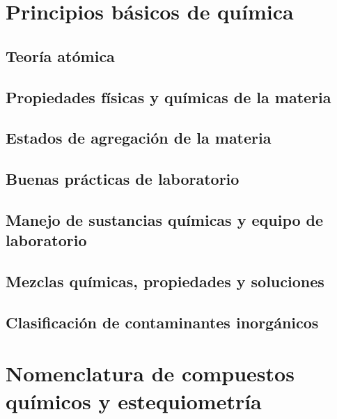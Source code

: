 \documentclass{../summarie}
\begin{document}
\frontmatter

    \Portada
    \tableofcontents
    \listoffigures
    \listoftables

\mainmatter

    \onehalfspacing
    \bibliographyunit[\chapter]


\part{Principios básicos de química}

    \chapter{Teoría atómica}     
    \chapter{Propiedades físicas y químicas de la materia} 
    \chapter{Estados de agregación de la materia} 
    \chapter{Buenas prácticas de laboratorio} 
    \chapter{Manejo de sustancias químicas y equipo de laboratorio} 
    \chapter{Mezclas químicas, propiedades y soluciones} 
    \chapter{Clasificación de contaminantes inorgánicos} 

\part{Nomenclatura de compuestos químicos y estequiometría}
\end{document}
